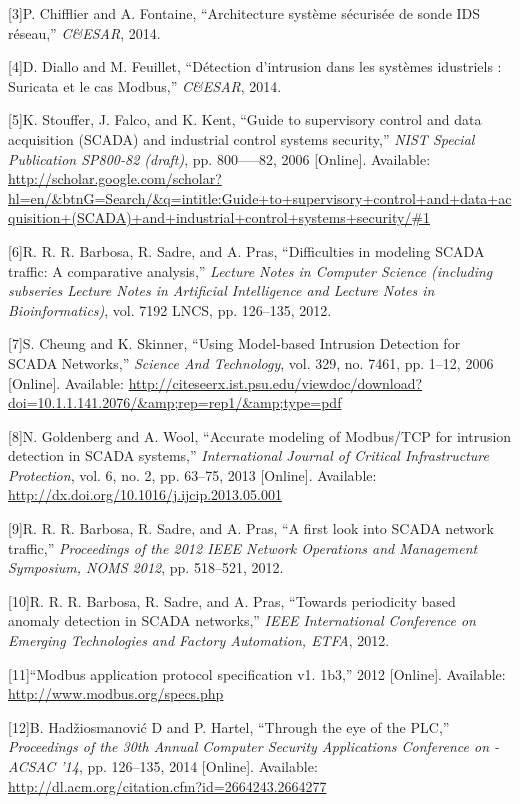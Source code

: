 \documentclass[11pt,]{article}
\begin{document}
{[}3{]}P. Chifflier and A. Fontaine, ``Architecture système sécurisée de
sonde IDS réseau,'' \emph{C\&ESAR}, 2014.

{[}4{]}D. Diallo and M. Feuillet, ``Détection d'intrusion dans les
systèmes idustriels : Suricata et le cas Modbus,'' \emph{C\&ESAR}, 2014.

{[}5{]}K. Stouffer, J. Falco, and K. Kent, ``Guide to supervisory
control and data acquisition (SCADA) and industrial control systems
security,'' \emph{NIST Special Publication SP800-82 (draft)}, pp.
800-----82, 2006 {[}Online{]}. Available:
\url{http://scholar.google.com/scholar?hl=en/\&btnG=Search/\&q=intitle:Guide+to+supervisory+control+and+data+acquisition+(SCADA)+and+industrial+control+systems+security/\#1}

{[}6{]}R. R. R. Barbosa, R. Sadre, and A. Pras, ``Difficulties in
modeling SCADA traffic: A comparative analysis,'' \emph{Lecture Notes in
Computer Science (including subseries Lecture Notes in Artificial
Intelligence and Lecture Notes in Bioinformatics)}, vol. 7192 LNCS, pp.
126--135, 2012.

{[}7{]}S. Cheung and K. Skinner, ``Using Model-based Intrusion Detection
for SCADA Networks,'' \emph{Science And Technology}, vol. 329, no. 7461,
pp. 1--12, 2006 {[}Online{]}. Available:
\url{http://citeseerx.ist.psu.edu/viewdoc/download?doi=10.1.1.141.2076/\&amp;rep=rep1/\&amp;type=pdf}

{[}8{]}N. Goldenberg and A. Wool, ``Accurate modeling of Modbus/TCP for
intrusion detection in SCADA systems,'' \emph{International Journal of
Critical Infrastructure Protection}, vol. 6, no. 2, pp. 63--75, 2013
{[}Online{]}. Available:
\url{http://dx.doi.org/10.1016/j.ijcip.2013.05.001}

{[}9{]}R. R. R. Barbosa, R. Sadre, and A. Pras, ``A first look into
SCADA network traffic,'' \emph{Proceedings of the 2012 IEEE Network
Operations and Management Symposium, NOMS 2012}, pp. 518--521, 2012.

{[}10{]}R. R. R. Barbosa, R. Sadre, and A. Pras, ``Towards periodicity
based anomaly detection in SCADA networks,'' \emph{IEEE International
Conference on Emerging Technologies and Factory Automation, ETFA}, 2012.

{[}11{]}``Modbus application protocol specification v1. 1b3,'' 2012
{[}Online{]}. Available: \url{http://www.modbus.org/specs.php}

{[}12{]}B. Hadžiosmanović D and P. Hartel, ``Through the eye of the
PLC,'' \emph{Proceedings of the 30th Annual Computer Security
Applications Conference on - ACSAC '14}, pp. 126--135, 2014
{[}Online{]}. Available:
\url{http://dl.acm.org/citation.cfm?id=2664243.2664277}
\end{document}
